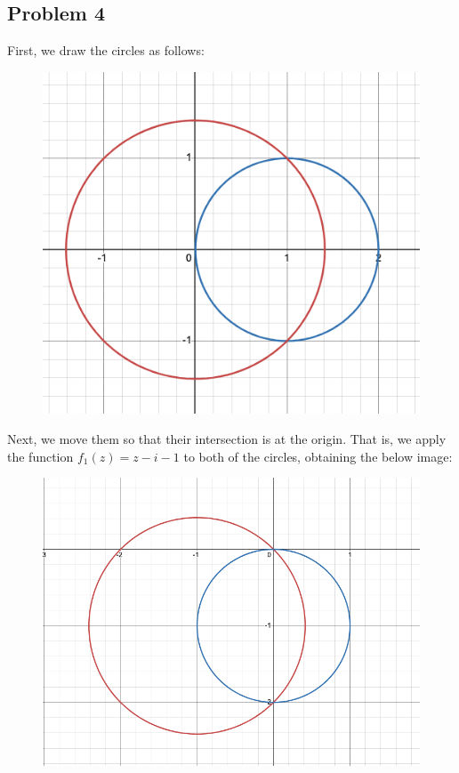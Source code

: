 \documentclass[12pt]{article}
\begin{document}
\subsection*{Problem 4}
First, we draw the circles as follows:
\begin{figure}[H]
\centering
\includegraphics[width=\textwidth]{Image1}
\end{figure}
Next, we move them so that their intersection is at the origin. That is, we apply the function $f_1(z) = z - i -1$ to both of the circles, obtaining the below image:
\begin{figure}[H]
\centering
\includegraphics[width=\textwidth]{Image2}
\end{figure}
\end{document}
